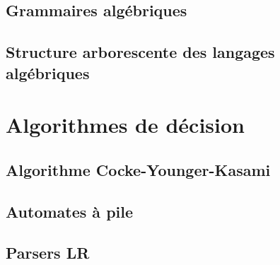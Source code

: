 \subsection{Grammaires algébriques}





 
\subsection{Structure arborescente des langages algébriques}






 
\section{Algorithmes de décision}
 
\subsection{Algorithme Cocke-Younger-Kasami}




 
\subsection{Automates à pile}











 
\subsection{Parsers LR}







 
